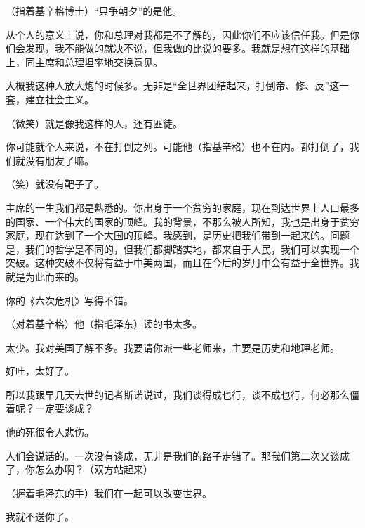 （指着基辛格博士）“只争朝夕”的是他。

从个人的意义上说，你和总理对我都是不了解的，因此你们不应该信任我。但是你们会发现，我不能做的就决不说，但我做的比说的要多。我就是想在这样的基础上，同主席和总理坦率地交换意见。

大概我这种人放大炮的时候多。无非是“全世界团结起来，打倒帝、修、反”这一套，建立社会主义。

（微笑）就是像我这样的人，还有匪徒。

你可能就个人来说，不在打倒之列。可能他（指基辛格）也不在内。都打倒了，我们就没有朋友了嘛。

（笑）就没有靶子了。

主席的一生我们都是熟悉的。你出身于一个贫穷的家庭，现在到达世界上人口最多的国家、一个伟大的国家的顶峰。我的背景，不那么被人所知，我也是出身于贫穷家庭，现在达到了一个大国的顶峰。我感到，是历史把我们带到一起来的。问题是，我们的哲学是不同的，但我们都脚踏实地，都来自于人民，我们可以实现一个突破。这种突破不仅将有益于中美两国，而且在今后的岁月中会有益于全世界。我就是为此而来的。

你的《六次危机》写得不错。

（对着基辛格）他（指毛泽东）读的书太多。

太少。我对美国了解不多。我要请你派一些老师来，主要是历史和地理老师。

好哇，太好了。

所以我跟早几天去世的记者斯诺说过，我们谈得成也行，谈不成也行，何必那么僵着呢？一定要谈成？

他的死很令人悲伤。

人们会说话的。一次没有谈成，无非是我们的路子走错了。那我们第二次又谈成了，你怎么办啊？（双方站起来）

（握着毛泽东的手）我们在一起可以改变世界。

我就不送你了。

